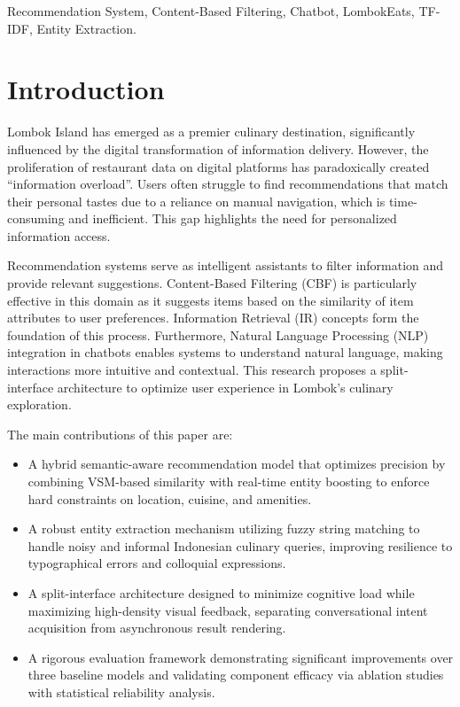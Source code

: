 \documentclass[conference]{IEEEtran}
\begin{document}
\begin{IEEEkeywords}
Recommendation System, Content-Based Filtering, Chatbot, LombokEats, TF-IDF, Entity Extraction.
\end{IEEEkeywords}

\section{Introduction}
Lombok Island has emerged as a premier culinary destination, significantly influenced by the digital transformation of information delivery\cite{b10}. However, the proliferation of restaurant data on digital platforms has paradoxically created ``information overload''\cite{b1,b2}. Users often struggle to find recommendations that match their personal tastes due to a reliance on manual navigation, which is time-consuming and inefficient\cite{b10}. This gap highlights the need for personalized information access\cite{b1}.

Recommendation systems serve as intelligent assistants to filter information and provide relevant suggestions\cite{b11}. Content-Based Filtering (CBF) is particularly effective in this domain as it suggests items based on the similarity of item attributes to user preferences\cite{b1,b11}. Information Retrieval (IR) concepts form the foundation of this process\cite{b6}. Furthermore, Natural Language Processing (NLP) integration in chatbots enables systems to understand natural language, making interactions more intuitive and contextual\cite{b7}. This research proposes a split-interface architecture to optimize user experience in Lombok's culinary exploration\cite{b10}.

The main contributions of this paper are:
\begin{itemize}
    \item A hybrid semantic-aware recommendation model that optimizes precision by combining VSM-based similarity with real-time entity boosting to enforce hard constraints on location, cuisine, and amenities.
    \item A robust entity extraction mechanism utilizing fuzzy string matching to handle noisy and informal Indonesian culinary queries, improving resilience to typographical errors and colloquial expressions.
    \item A split-interface architecture designed to minimize cognitive load while maximizing high-density visual feedback, separating conversational intent acquisition from asynchronous result rendering.
    \item A rigorous evaluation framework demonstrating significant improvements over three baseline models and validating component efficacy via ablation studies with statistical reliability analysis.
\end{itemize}
\end{document}
